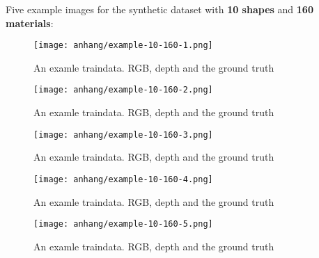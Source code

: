 	\FloatBarrier
	\clearpage
	Five example images for the synthetic dataset with \textbf{10 shapes} and \textbf{160 materials}:
	\begin{figure}[H]
		\centering
		\texttt{[image: anhang/example-10-160-1.png]}
		\caption[An examle traindata. RGB, depth and the ground truth]{An examle traindata. RGB, depth and the ground truth}
	\end{figure}
	\begin{figure}[H]
		\centering
		\texttt{[image: anhang/example-10-160-2.png]}
		\caption[An examle traindata. RGB, depth and the ground truth]{An examle traindata. RGB, depth and the ground truth}
	\end{figure}
	\begin{figure}[H]
		\centering
		\texttt{[image: anhang/example-10-160-3.png]}
		\caption[An examle traindata. RGB, depth and the ground truth]{An examle traindata. RGB, depth and the ground truth}
	\end{figure}
	\begin{figure}[H]
		\centering
		\texttt{[image: anhang/example-10-160-4.png]}
		\caption[An examle traindata. RGB, depth and the ground truth]{An examle traindata. RGB, depth and the ground truth}
	\end{figure}
	\begin{figure}[H]
		\centering
		\texttt{[image: anhang/example-10-160-5.png]}
		\caption[An examle traindata. RGB, depth and the ground truth]{An examle traindata. RGB, depth and the ground truth}
	\end{figure}
	
